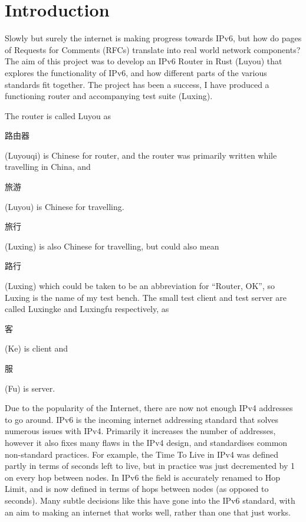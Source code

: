 \documentclass[12pt,a4paper,twoside,openright]{report}
\begin{document}

\pagestyle{headings}

\chapter{Introduction}
\label{chap::introduction}
Slowly but surely the internet is making progress towards IPv6, but how do pages of Requests for Comments (RFCs) translate into real world network components? The aim of this project was to develop an IPv6 Router in Rust (Luyou) that explores the functionality of IPv6, and how different parts of the various standards fit together. The project has been a success, I have produced a functioning router and accompanying test suite (Luxing).

\bigskip

The router is called Luyou as \begin{CJK}{UTF8}{gbsn}路由器\end{CJK} (Luyouqi) is Chinese for router, and the router was primarily written while travelling in China, and \begin{CJK}{UTF8}{gbsn}旅游\end{CJK} (Luyou) is Chinese for travelling. \begin{CJK}{UTF8}{gbsn}旅行\end{CJK} (Luxing) is also Chinese for travelling, but could also mean \begin{CJK}{UTF8}{gbsn}路行\end{CJK} (Luxing) which could be taken to be an abbreviation for ``Router, OK'', so Luxing is the name of my test bench. The small test client and test server are called Luxingke and Luxingfu respectively, as \begin{CJK}{UTF8}{gbsn}客\end{CJK} (Ke) is client and \begin{CJK}{UTF8}{gbsn}服\end{CJK} (Fu) is server.

\bigskip

Due to the popularity of the Internet, there are now not enough IPv4 addresses to go around. IPv6 is the incoming internet addressing standard that solves numerous issues with IPv4.  Primarily it increases the number of addresses, however it also fixes many flaws in the IPv4 design, and standardises common non-standard practices. For example, the Time To Live in IPv4 was defined partly in terms of seconds left to live\cite{ipv4_rfc}, but in practice was just decremented by 1 on every hop between nodes. In IPv6 the field is accurately renamed to Hop Limit, and is now defined in terms of hops between nodes (as opposed to seconds). Many subtle decisions like this have gone into the IPv6 standard, with an aim to making an internet that works well, rather than one that just works.
\end{document}
